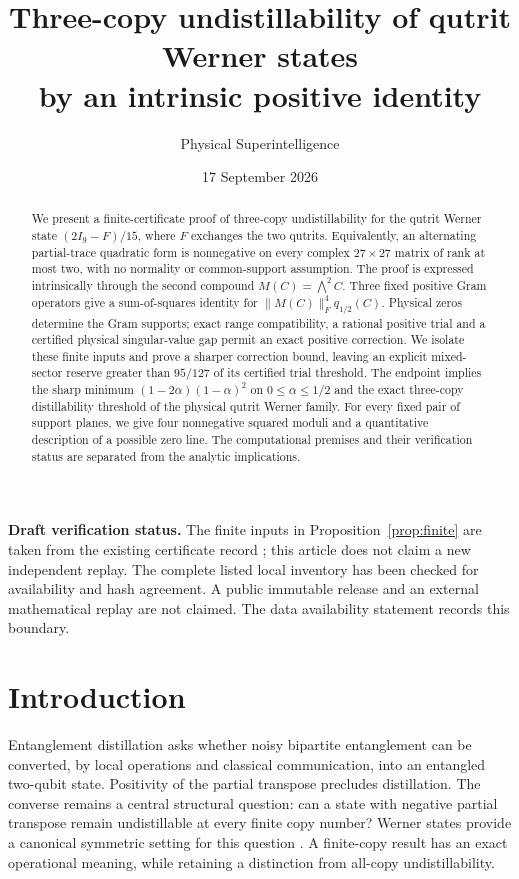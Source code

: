 \documentclass[11pt,a4paper]{article}
\title{\bfseries Three-copy undistillability of qutrit Werner states\\
by an intrinsic positive identity}
\author{Physical Superintelligence}
\date{17 September 2026}
\theoremstyle{definition}\newtheorem{definition}[theorem]{Definition}
\theoremstyle{remark}\newtheorem{remark}[theorem]{Remark}
\numberwithin{equation}{section}
\begin{document}
\maketitle
\begin{abstract}
We present a finite-certificate proof of three-copy undistillability
for the qutrit Werner state $(2I_9-F)/15$, where $F$ exchanges the
two qutrits. Equivalently, an alternating partial-trace quadratic
form is nonnegative on every complex $27\times27$ matrix of rank
at most two, with no normality or common-support assumption.
The proof is expressed intrinsically through the second compound
$M(C)=\bigwedge^2C$. Three fixed positive Gram operators give a
sum-of-squares identity for $\|M(C)\|_F^4q_{1/2}(C)$.
Physical zeros determine the Gram supports; exact range compatibility,
a rational positive trial and a certified physical singular-value gap
permit an exact positive correction. We isolate these finite inputs
and prove a sharper correction bound, leaving an explicit mixed-sector
reserve greater than $95/127$ of its certified trial threshold.
The endpoint implies the sharp minimum
$(1-2\alpha)(1-\alpha)^2$ on $0\le\alpha\le1/2$ and the exact
three-copy distillability threshold of the physical qutrit Werner
family. For every fixed pair of support planes, we give four
nonnegative squared moduli and a quantitative description of a
possible zero line. The computational premises and their verification
status are separated from the analytic implications.
\end{abstract}

\noindent\textbf{Draft verification status.}
The finite inputs in Proposition~\ref{prop:finite} are taken from the
existing certificate record \cite{certificate}; this article does
not claim a new independent replay. The complete listed local inventory
has been checked for availability and hash agreement. A public immutable
release and an external mathematical replay are not claimed.
The data availability statement records this boundary.

\section{Introduction}
Entanglement distillation asks whether noisy bipartite entanglement can
be converted, by local operations and classical communication, into
an entangled two-qubit state. Positivity of the partial transpose
precludes distillation. The converse remains a central structural
question: can a state with negative partial transpose remain
undistillable at every finite copy number?
Werner states provide a canonical symmetric setting for this question
\cite{werner,hhh98,dss00}. A finite-copy result has an exact operational
meaning, while retaining a distinction from all-copy undistillability.
\end{document}
